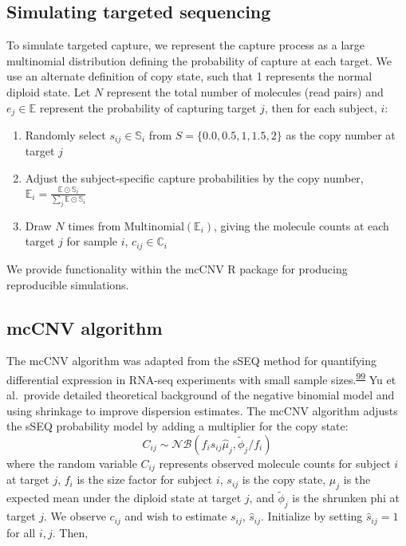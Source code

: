 \documentclass[11pt,letterpaper,oneside]{book}
\begin{document}
\hypertarget{simulating-targeted-sequencing}{%
\subsection{Simulating targeted sequencing}\label{simulating-targeted-sequencing}}

To simulate targeted capture, we represent the capture process as a large multinomial distribution defining the probability of capture at each target.
We use an alternate definition of copy state, such that 1 represents the normal diploid state.
Let \(N\) represent the total number of molecules (read pairs) and \(e_j \in \mathbb{E}\) represent the probability of capturing target \(j\), then for each subject, \(i\):

\begin{enumerate}
\def\labelenumi{\arabic{enumi}.}
\item
  Randomly select \(s_{ij} \in \mathbb{S}_i\) from \(S = \{0.0, 0.5, 1, 1.5, 2\}\) as the copy number at target \(j\)
\item
  Adjust the subject-specific capture probabilities by the copy number, \(\mathbb{E}_i = \frac{\mathbb{E} \odot \mathbb{S}_{i}}{\sum_j \mathbb{E} \odot \mathbb{S}_{i}}\)
\item
  Draw \(N\) times from \(\text{Multinomial}(\mathbb{E}_i)\), giving the molecule counts at each target \(j\) for sample \(i\), \(c_{ij} \in \mathbb{C}_i\)
\end{enumerate}

We provide functionality within the mcCNV R package for producing reproducible simulations.

\hypertarget{mccnv-algorithm}{%
\subsection{mcCNV algorithm}\label{mccnv-algorithm}}

The mcCNV algorithm was adapted from the sSEQ method for quantifying differential expression in RNA-seq experiments with small sample sizes.\textsuperscript{\protect\hyperlink{ref-yu:2013aa}{99}}
Yu et al.~provide detailed theoretical background of the negative binomial model and using shrinkage to improve dispersion estimates.
The mcCNV algorithm adjusts the sSEQ probability model by adding a multiplier for the copy state:
\[
  C_{ij} \sim \mathcal{NB}(f_is_{ij}\hat\mu_j, \tilde\phi_j/f_i)
\]
where the random variable \(C_{ij}\) represents observed molecule counts for subject \(i\) at target \(j\), \(f_i\) is the size factor for subject \(i\), \(s_{ij}\) is the copy state, \(\mu_j\) is the expected mean under the diploid state at target \(j\), and \(\tilde\phi_j\) is the shrunken phi at target \(j\).
We observe \(c_{ij}\) and wish to estimate \(s_{ij}\), \(\hat{s}_{ij}\).
Initialize by setting \(\hat{s}_{ij} = 1\) for all \(i,j\). Then,
\end{document}
